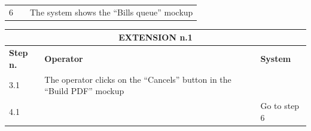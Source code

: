{{{\begin{center}
\begin{tabular}{|p{2cm}|p{6cm}|p{6cm}|}
				\vspace{1mm} \vspace{1mm} \\
			\hline
				\vspace{1mm} 6 \vspace{1mm} &
				\vspace{1mm} \vspace{1mm} & 
				\vspace{1mm} The system shows the “Bills queue” mockup\vspace{1mm} \\
			\hline
			\end{tabular}

			\begin{tabular}{|p{2cm}|p{6cm}|p{6cm}|}
			\hline
				\multicolumn{3}{|c|}{EXTENSION n.1}\\
			\hline
				\centering \vspace{1mm} \bfseries{Step n.} \vspace{1mm} & \vspace{1mm} \bfseries{Operator} \vspace{1mm} & \vspace{1mm} \bfseries{System} \vspace{1mm}\\
			\hline
				\vspace{1mm} 3.1 \vspace{1mm} &
				\vspace{1mm} The operator clicks on the “Cancels” button in the “Build PDF” mockup \vspace{1mm} & 
				\vspace{1mm} \vspace{1mm} \\
			\hline
				\vspace{1mm} 4.1 \vspace{1mm} &
				\vspace{1mm} \vspace{1mm} & 
				\vspace{1mm} Go to step 6\vspace{1mm} \\
			\hline
			\end{tabular}


\end{center}}}}
